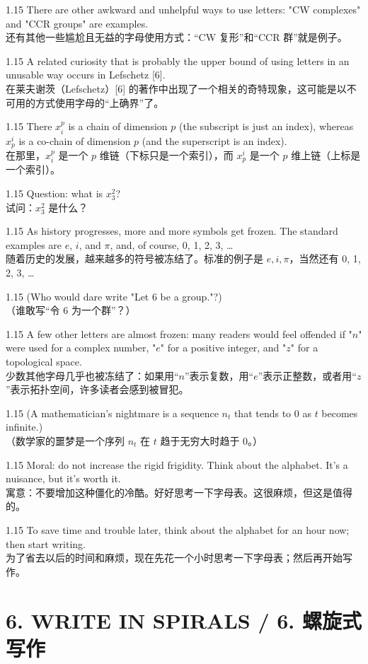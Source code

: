 \documentclass[12pt,a4paper]{article}
\newcommand{\bilingual}[2]{
    \begin{spacing}{1.15} %
        \noindent \normalsize #1 \\[-0.5ex] %
        \small \textcolor{blue!70!black}{#2} %
    \end{spacing}
    \vspace{0.8em} %
}
\begin{document}
\bilingual{There are other awkward and unhelpful ways to use letters: "CW complexes" and "CCR groups" are examples.}
{还有其他一些尴尬且无益的字母使用方式：“CW 复形”和“CCR 群”就是例子。} %

\bilingual{A related curiosity that is probably the upper bound of using letters in an unusable way occurs in Lefschetz [6].}
{在莱夫谢茨（Lefschetz）[6] 的著作中出现了一个相关的奇特现象，这可能是以不可用的方式使用字母的“上确界”了。} %

\bilingual{There $x_{i}^{p}$ is a chain of dimension $p$ (the subscript is just an index), whereas $x_{p}^{i}$ is a co-chain of dimension $p$ (and the superscript is an index).}
{在那里，$x_{i}^{p}$ 是一个 $p$ 维链（下标只是一个索引），而 $x_{p}^{i}$ 是一个 $p$ 维上链（上标是一个索引）。} %

\bilingual{Question: what is $x_{3}^{2}$?}
{试问：$x_{3}^{2}$ 是什么？} %

\bilingual{As history progresses, more and more symbols get frozen. The standard examples are $e$, $i$, and $\pi$, and, of course, 0, 1, 2, 3, \dots}
{随着历史的发展，越来越多的符号被冻结了。标准的例子是 $e, i, \pi$，当然还有 0, 1, 2, 3, \dots} %

\bilingual{(Who would dare write "Let 6 be a group."?)}
{（谁敢写“令 6 为一个群”？）} %

\bilingual{A few other letters are almost frozen: many readers would feel offended if "$n$" were used for a complex number, "$e$" for a positive integer, and "$z$" for a topological space.}
{少数其他字母几乎也被冻结了：如果用“$n$”表示复数，用“$e$”表示正整数，或者用“$z$”表示拓扑空间，许多读者会感到被冒犯。} %

\bilingual{(A mathematician's nightmare is a sequence $n_{t}$ that tends to 0 as $t$ becomes infinite.)}
{（数学家的噩梦是一个序列 $n_{t}$ 在 $t$ 趋于无穷大时趋于 0。）} %

\bilingual{Moral: do not increase the rigid frigidity. Think about the alphabet. It's a nuisance, but it's worth it.}
{寓意：不要增加这种僵化的冷酷。好好思考一下字母表。这很麻烦，但这是值得的。} %

\bilingual{To save time and trouble later, think about the alphabet for an hour now; then start writing.}
{为了省去以后的时间和麻烦，现在先花一个小时思考一下字母表；然后再开始写作。} %

\section*{6. WRITE IN SPIRALS / 6. 螺旋式写作} %
\end{document}
